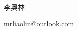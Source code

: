 
\begin{titlepage}
      \begin{center}
         ~\\[3cm]
         {\Huge\textbf{\BookTitle}}

         \vspace{7cm}
         {\Large 李奥林}

         \vspace{2em}
         {\Large mrliaolin@outlook.com}
      \end{center}
\end{titlepage}
